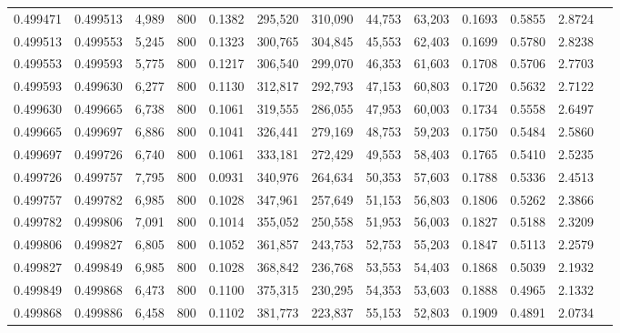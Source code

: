 \begin{tabular}{rrrrrrrrrrrrr}
0.499471 & 0.499513 & 4,989 & 800 &                                     0.1382 & 295,520 & 310,090 &  44,753 &  63,203 & 0.1693 & 0.5855 & 2.8724 \\
0.499513 & 0.499553 & 5,245 & 800 &                                     0.1323 & 300,765 & 304,845 &  45,553 &  62,403 & 0.1699 & 0.5780 & 2.8238 \\
0.499553 & 0.499593 & 5,775 & 800 &                                     0.1217 & 306,540 & 299,070 &  46,353 &  61,603 & 0.1708 & 0.5706 & 2.7703 \\
0.499593 & 0.499630 & 6,277 & 800 &                                     0.1130 & 312,817 & 292,793 &  47,153 &  60,803 & 0.1720 & 0.5632 & 2.7122 \\
0.499630 & 0.499665 & 6,738 & 800 &                                     0.1061 & 319,555 & 286,055 &  47,953 &  60,003 & 0.1734 & 0.5558 & 2.6497 \\
0.499665 & 0.499697 & 6,886 & 800 &                                     0.1041 & 326,441 & 279,169 &  48,753 &  59,203 & 0.1750 & 0.5484 & 2.5860 \\
0.499697 & 0.499726 & 6,740 & 800 &                                     0.1061 & 333,181 & 272,429 &  49,553 &  58,403 & 0.1765 & 0.5410 & 2.5235 \\
0.499726 & 0.499757 & 7,795 & 800 &                                     0.0931 & 340,976 & 264,634 &  50,353 &  57,603 & 0.1788 & 0.5336 & 2.4513 \\
0.499757 & 0.499782 & 6,985 & 800 &                                     0.1028 & 347,961 & 257,649 &  51,153 &  56,803 & 0.1806 & 0.5262 & 2.3866 \\
0.499782 & 0.499806 & 7,091 & 800 &                                     0.1014 & 355,052 & 250,558 &  51,953 &  56,003 & 0.1827 & 0.5188 & 2.3209 \\
0.499806 & 0.499827 & 6,805 & 800 &                                     0.1052 & 361,857 & 243,753 &  52,753 &  55,203 & 0.1847 & 0.5113 & 2.2579 \\
0.499827 & 0.499849 & 6,985 & 800 &                                     0.1028 & 368,842 & 236,768 &  53,553 &  54,403 & 0.1868 & 0.5039 & 2.1932 \\
0.499849 & 0.499868 & 6,473 & 800 &                                     0.1100 & 375,315 & 230,295 &  54,353 &  53,603 & 0.1888 & 0.4965 & 2.1332 \\
0.499868 & 0.499886 & 6,458 & 800 &                                     0.1102 & 381,773 & 223,837 &  55,153 &  52,803 & 0.1909 & 0.4891 & 2.0734 \\

\end{tabular}

